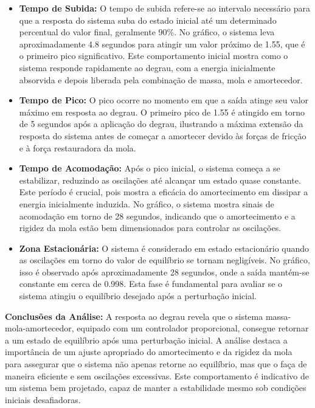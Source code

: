 \begin{itemize}
    \item \textbf{Tempo de Subida:} O tempo de subida refere-se ao intervalo necessário para que a resposta do sistema suba do estado inicial até um determinado percentual do valor final, geralmente 90\%. No gráfico, o sistema leva aproximadamente 4.8 segundos para atingir um valor próximo de 1.55, que é o primeiro pico significativo. Este comportamento inicial mostra como o sistema responde rapidamente ao degrau, com a energia inicialmente absorvida e depois liberada pela combinação de massa, mola e amortecedor.
    \item \textbf{Tempo de Pico:} O pico ocorre no momento em que a saída atinge seu valor máximo em resposta ao degrau. O primeiro pico de 1.55 é atingido em torno de 5 segundos após a aplicação do degrau, ilustrando a máxima extensão da resposta do sistema antes de começar a amortecer devido às forças de fricção e à força restauradora da mola.

    \item \textbf{Tempo de Acomodação:} Após o pico inicial, o sistema começa a se estabilizar, reduzindo as oscilações até alcançar um estado quase constante. Este período é crucial, pois mostra a eficácia do amortecimento em dissipar a energia inicialmente induzida. No gráfico, o sistema mostra sinais de acomodação em torno de 28 segundos, indicando que o amortecimento e a rigidez da mola estão bem dimensionados para controlar as oscilações.

    \item \textbf{Zona Estacionária:} O sistema é considerado em estado estacionário quando as oscilações em torno do valor de equilíbrio se tornam negligíveis. No gráfico, isso é observado após aproximadamente 28 segundos, onde a saída mantém-se constante em cerca de 0.998. Esta fase é fundamental para avaliar se o sistema atingiu o equilíbrio desejado após a perturbação inicial.
\end{itemize}


\textbf{Conclusões da Análise:} A resposta ao degrau revela que o sistema massa-mola-amortecedor, equipado com um controlador proporcional, consegue retornar a um estado de equilíbrio após uma perturbação inicial. A análise destaca a importância de um ajuste apropriado do amortecimento e da rigidez da mola para assegurar que o sistema não apenas retorne ao equilíbrio, mas que o faça de maneira eficiente e sem oscilações excessivas. Este comportamento é indicativo de um sistema bem projetado, capaz de manter a estabilidade mesmo sob condições iniciais desafiadoras.


